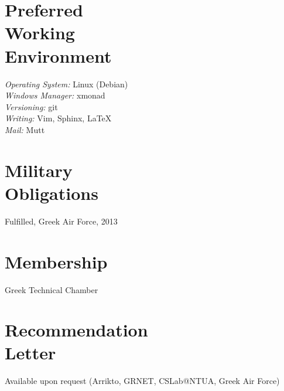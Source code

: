 \documentclass[margin,centered]{res}
\begin{document}
\begin{resume}
\section{\sc Preferred\\Working\\Environment}
\textit{Operating System:} Linux (Debian)\\
\textit{Windows Manager:} xmonad\\
\textit{Versioning:} git\\
\textit{Writing:} Vim, Sphinx, \LaTeX\\
\textit{Mail:} Mutt

\section{\sc Military\\Obligations}
Fulfilled, Greek Air Force, 2013

\section{\sc Membership}
Greek Technical Chamber

%
\section{\sc Recommendation\\Letter}
Available upon request (Arrikto, GRNET, CSLab@NTUA, Greek Air Force)

\end{resume}

\def\enoteheading{\section{Notes}\rule[0pt]{\textwidth}{0.4pt}}
\parskip=2pt
\theendnotes
\end{document}
